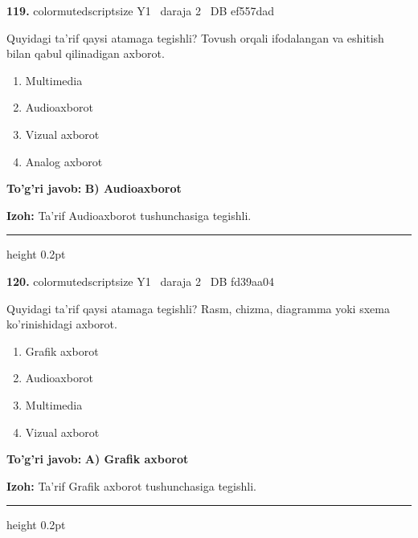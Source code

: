 \documentclass[10pt,a4paper,oneside]{article}
\begin{document}
\noindent\textbf{\color{ink}119.}  {color{muted}scriptsize Y1 \textbullet\ daraja 2 \textbullet\ DB ef557dad}
\par
Quyidagi ta'rif qaysi atamaga tegishli? Tovush orqali ifodalangan va eshitish bilan qabul qilinadigan axborot.
\begin{enumerate}[label=\Alph*),leftmargin=9mm]
\item Multimedia
\item Audioaxborot
\item Vizual axborot
\item Analog axborot
\end{enumerate}
\begin{tcolorbox}[enhanced,breakable,colback=teal!4,colframe=teal!50!black,boxrule=0.5pt,arc=1.1mm,left=3mm,right=3mm,top=1.7mm,bottom=1.7mm,before skip=2mm,after skip=2mm]
\textbf{\color{teal}To'g'ri javob:} \textbf{B) Audioaxborot}
\par\smallskip
\textbf{Izoh:} Ta'rif Audioaxborot tushunchasiga tegishli.
\end{tcolorbox}
\vspace{2mm}\hrule height 0.2pt \vspace{3mm}

\noindent\textbf{\color{ink}120.}  {color{muted}scriptsize Y1 \textbullet\ daraja 2 \textbullet\ DB fd39aa04}
\par
Quyidagi ta'rif qaysi atamaga tegishli? Rasm, chizma, diagramma yoki sxema ko'rinishidagi axborot.
\begin{enumerate}[label=\Alph*),leftmargin=9mm]
\item Grafik axborot
\item Audioaxborot
\item Multimedia
\item Vizual axborot
\end{enumerate}
\begin{tcolorbox}[enhanced,breakable,colback=teal!4,colframe=teal!50!black,boxrule=0.5pt,arc=1.1mm,left=3mm,right=3mm,top=1.7mm,bottom=1.7mm,before skip=2mm,after skip=2mm]
\textbf{\color{teal}To'g'ri javob:} \textbf{A) Grafik axborot}
\par\smallskip
\textbf{Izoh:} Ta'rif Grafik axborot tushunchasiga tegishli.
\end{tcolorbox}
\vspace{2mm}\hrule height 0.2pt \vspace{3mm}
\end{document}
